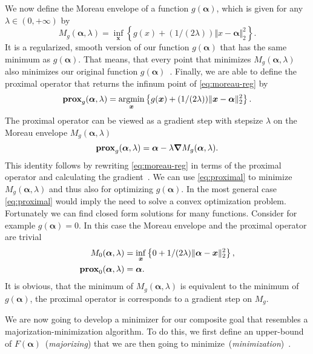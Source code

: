 We now define the Moreau envelope of a function \(g (\bm{\alpha})\), which is given for any \(\lambda \in (0, +\infty)\) by
\begin{equation}
  \label{eq:moreau-reg}
  M_{g}(\bm{\alpha}, \lambda) = \inf_{\bm{x}} \left\{  g(x) + (1/(2\lambda)) \Vert x - \bm{\alpha} \Vert_2^2 \right\}.
\end{equation}
It is a regularized, smooth version of our function \(g(\bm{\alpha})\) that has the
same minimum as \(g(\bm{\alpha})\).
That means, that every point that minimizes \(M_{g}(\bm{\alpha}, \lambda)\) also
minimizes our original function \(g (\bm{\alpha})\)~\cite{proxsurvey}.
Finally, we are able to define the proximal operator that returns the infinum
point of \autoref{eq:moreau-reg} by
\begin{equation}
  \label{eq:proximal}
  \prox[\(g\)]{\bm{\alpha}}{\lambda}= \argmin_{\bm{x}} \left\{ g (\bm{x}) + (1/ (2 \lambda)) \Vert \bm{x} - \bm{\alpha} \Vert_2^2 \right\}.
\end{equation}
The proximal operator can be viewed as a gradient step with stepsize \(\lambda\) on the Moreau envelope
\(M_g(\bm{\alpha}, \lambda)\)
\begin{equation*}
  \prox[\(g\)]{\bm{\alpha}}{\lambda} = \bm{\alpha} - \lambda \bm{\nabla} M_{g}(\bm{\alpha}, \lambda).
\end{equation*}
This identity follows by rewriting \autoref{eq:moreau-reg} in terms of the proximal operator and calculating the gradient~\cite{proxsurvey}.
We can use \autoref{eq:proximal} to minimize \(M_g(\bm{\alpha}, \lambda)\) and
thus also for optimizing \(g(\bm{\alpha})\).
In the most general case \autoref{eq:proximal} would imply the need to solve a convex optimization problem.
Fortunately we can find closed form solutions for many functions.
Consider for example \(g(\bm{\alpha}) = 0\).
In this case the Moreau envelope and the proximal operator are trivial
\begin{align*}
 M_{0}(\bm{\alpha}, \lambda) &= \inf_{\bm{x}} \left\{ 0 + 1/(2 \lambda) \Vert \bm{\alpha} - \bm{x} \Vert_2^2 \right\}, \\
 \prox[\(0\)]{\bm{\alpha}}{\lambda} &= \bm{\alpha}.
\end{align*}
It is obvious, that the minimum of \(M_g(\bm{\alpha}, \lambda)\) is equivalent to the minimum of \(g(\bm{\alpha})\), the proximal operator is corresponds to a gradient step on \(M_g\).

We are now going to develop a minimizer for our composite goal that resembles a majorization-minimization algorithm.
To do this, we first define an upper-bound of \(F(\bm{\alpha})\)~(\emph{majorizing}) that we are then going to minimize~(\emph{minimization})~\autocite{proxsurvey}.


